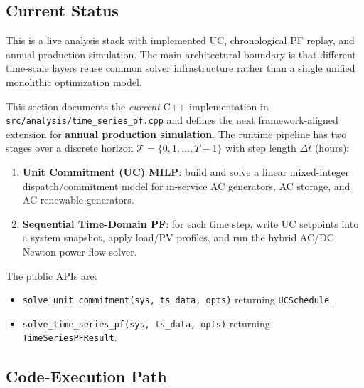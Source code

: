 \subsection{Current Status}

This is a live analysis stack with implemented UC, chronological PF replay, and
annual production simulation.  The main architectural boundary is that different
time-scale layers reuse common solver infrastructure rather than a single unified
monolithic optimization model.

This section documents the \emph{current} C++ implementation in
\texttt{src/analysis/time\_series\_pf.cpp} and defines the next
framework-aligned extension for \textbf{annual production simulation}.
The runtime pipeline has two
stages over a discrete horizon
\(\mathcal{T}=\{0,1,\dots,T-1\}\) with step length \(\Delta t\) (hours):
\begin{enumerate}
\item \textbf{Unit Commitment (UC) MILP}: build and solve a linear mixed-integer
      dispatch/commitment model for in-service AC generators, AC storage, and
      AC renewable generators.
\item \textbf{Sequential Time-Domain PF}: for each time step, write UC setpoints
      into a system snapshot, apply load/PV profiles, and run the hybrid AC/DC
      Newton power-flow solver.
\end{enumerate}

The public APIs are:
\begin{itemize}
\item \texttt{solve\_unit\_commitment(sys, ts\_data, opts)} returning \texttt{UCSchedule},
\item \texttt{solve\_time\_series\_pf(sys, ts\_data, opts)} returning \texttt{TimeSeriesPFResult}.
\end{itemize}

\subsection{Code-Execution Path}

